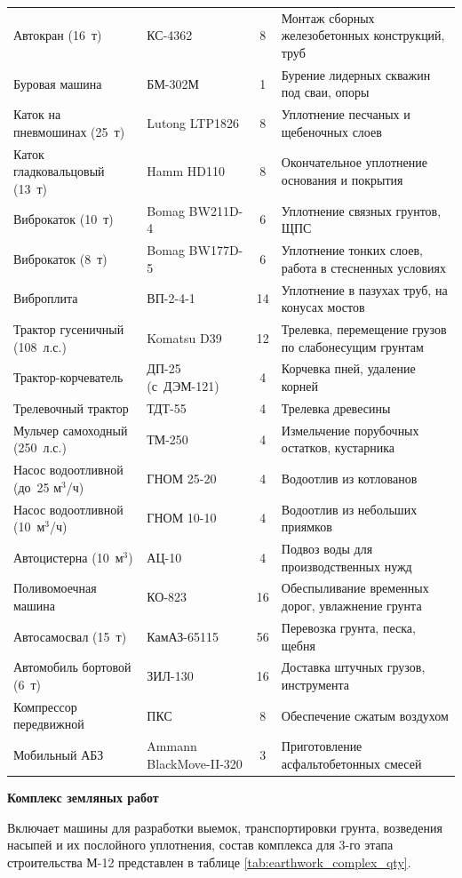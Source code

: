 \begin{longtable}{|>{\raggedright\arraybackslash}p{3.8cm}|>{\raggedright\arraybackslash}p{3.2cm}|c|>{\raggedright\arraybackslash}p{5.0cm}|}
	Автокран (16~т) & КС-4362 & 8 & Монтаж сборных железобетонных конструкций, труб \\
	Буровая машина & БМ-302М & 1 & Бурение лидерных скважин под сваи, опоры \\
	Каток на пневмошинах (25~т) & Lutong LTP1826 & 8 & Уплотнение песчаных и щебеночных слоев \\
	Каток гладковальцовый (13~т) & Hamm HD110 & 8 & Окончательное уплотнение основания и покрытия \\
	Виброкаток (10~т) & Bomag BW211D-4 & 6 & Уплотнение связных грунтов, ЩПС \\
	Виброкаток (8~т) & Bomag BW177D-5 & 6 & Уплотнение тонких слоев, работа в стесненных условиях \\
	Виброплита & ВП-2-4-1 & 14 & Уплотнение в пазухах труб, на конусах мостов \\
	Трактор гусеничный (108~л.с.) & Komatsu D39 & 12 & Трелевка, перемещение грузов по слабонесущим грунтам \\
	Трактор-корчеватель & ДП-25 (с~ДЭМ-121) & 4 & Корчевка пней, удаление корней \\
	Трелевочный трактор & ТДТ-55 & 4 & Трелевка древесины \\
	Мульчер самоходный (250~л.с.) & ТМ-250 & 4 & Измельчение порубочных остатков, кустарника \\
	Насос водоотливной (до~25 м\(^3\)/ч) & ГНОМ 25-20 & 4 & Водоотлив из котлованов \\
	Насос водоотливной (10~м\(^3\)/ч) & ГНОМ 10-10 & 4 & Водоотлив из небольших приямков \\
	Автоцистерна (10~м\(^3\)) & АЦ-10 & 4 & Подвоз воды для производственных нужд \\
	Поливомоечная машина & КО-823 & 16 & Обеспыливание временных дорог, увлажнение грунта \\
	Автосамосвал (15~т) & КамАЗ-65115 & 56 & Перевозка грунта, песка, щебня \\
	Автомобиль бортовой (6~т) & ЗИЛ-130 & 16 & Доставка штучных грузов, инструмента \\
	Компрессор передвижной & ПКС & 8 & Обеспечение сжатым воздухом \\
	Мобильный АБЗ & Ammann BlackMove-II-320 & 3 & Приготовление асфальтобетонных смесей \\
\end{longtable}

\textbf{Комплекс земляных работ}

Включает машины для разработки выемок, транспортировки грунта, возведения насыпей и их послойного уплотнения, состав комплекса для 3-го этапа строительства М-12 представлен в таблице \ref{tab:earthwork_complex_qty}.

